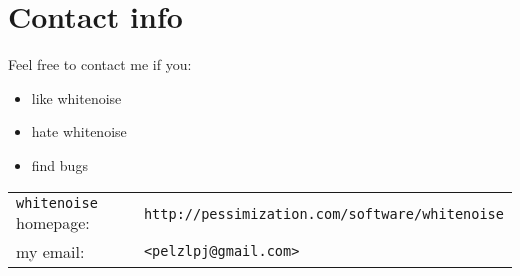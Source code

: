 \documentclass[12pt,oneside,notitlepage]{article}
\renewcommand{\arraystretch}{2.0}
\begin{document}
\section{Contact info}
Feel free to contact me if you:
\begin{itemize}
   \item like whitenoise
   \item hate whitenoise
   \item find bugs
\end{itemize}

\renewcommand{\arraystretch}{1.0}
\begin{tabular}{ll}
   {\tt whitenoise} homepage: & {\tt http://pessimization.com/software/whitenoise} \\
   my email: &                  {\tt <pelzlpj@gmail.com>}
\end{tabular}
\end{document}
